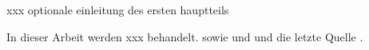




xxx optionale einleitung des ersten hauptteils


In dieser Arbeit werden xxx behandelt. \cite{Ableitinger2013kap2} sowie \cite{Aue2013} und \cite{Beutelspacher2011} und die letzte Quelle \cite{BifieStandards}.


